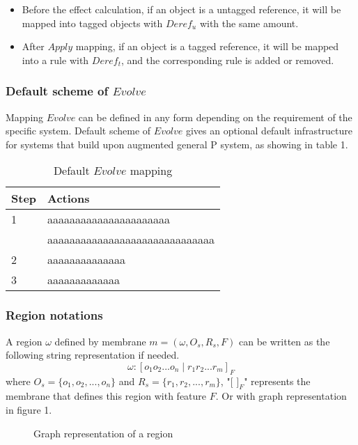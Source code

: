 \documentclass[9pt,a4paper,twoside]{article}
\begin{document}
    \begin{itemize}
        \item Before the effect calculation, if an object is a untagged reference, it will be mapped into tagged objects with $Deref_u$ with the same amount.
        \item After $Apply$ mapping, if an object is a tagged reference, it will be mapped into a rule with $Deref_t$, and the corresponding rule is added or removed. 
    \end{itemize}

\subsubsection{Default scheme of $Evolve$}
        Mapping $Evolve$ can be defined in any form depending on the requirement of the specific system. Default scheme of $Evolve$ gives an optional default infrastructure for systems that build upon augmented general P system, as showing in table 1.
\begin{table}[ht]
\centering
\begin{tabular}{ll}
\hline
Step & Actions           \\ \hline
1    & aaaaaaaaaaaaaaaaaaaaaa \\
     & aaaaaaaaaaaaaaaaaaaaaaaaaaaaaa\\
2    & aaaaaaaaaaaaaa    \\
3    & aaaaaaaaaaaaa     \\ \hline
\end{tabular}
\caption{Default $Evolve$ mapping }
\label{tab:my-table}
\end{table}

\subsubsection{Region notations}
    A region $\omega$ defined by membrane $m=(\omega, O_s, R_s, F)$ can be written as the 
    following string representation if needed.
    \begin{equation}
        \omega: [ o_1o_2...o_n \mid r_1r_2...r_m ]_F
    \end{equation}
    where $O_s = \{ o_1, o_2,...,o_n \}$ and $R_s = \{r_1,r_2,...,r_m\}$, "$[$ $]_F$" represents the membrane that defines this region with feature $F$. Or with graph representation in figure 1.
    \begin{figure}[ht]
        \centering
        
        \caption{Graph representation of a region}
        \label{fig:enter-label}
    \end{figure}
    
\end{document}
